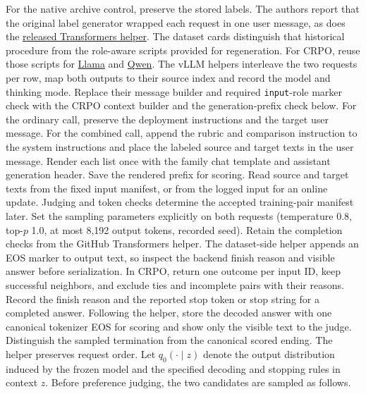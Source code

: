 \documentclass[11pt]{article}
\begin{document}
For the native archive control, preserve the stored labels. The authors report that the original label generator wrapped each request in one user message, as does the \href{https://github.com/Sizhe-Chen/SecPO/blob/da0372a0e598badf4e51c98c175a962147cac2ac/scripts/generate_response_labels.py}{released Transformers helper}. The dataset cards distinguish that historical procedure from the role-aware scripts provided for regeneration. For CRPO, reuse those scripts for \href{https://huggingface.co/datasets/Sizhe-Chen/Llama-3.1-8B-Instruct-SecPO-trainset/blob/f347c3abe1f451e88b02918c6bc3921e6816d8c6/generate_responses.py}{Llama} and \href{https://huggingface.co/datasets/Sizhe-Chen/Qwen3.6-27B-Instruct-SecPO-trainset/blob/0cbfd6e6a2c2966dbccf4fa89b6ea7fe20c8703e/generate_responses.py}{Qwen}. The vLLM helpers interleave the two requests per row, map both outputs to their source index and record the model and thinking mode. Replace their message builder and required \texttt{input}-role marker check with the CRPO context builder and the generation-prefix check below. For the ordinary call, preserve the deployment instructions and the target user message. For the combined call, append the rubric and comparison instruction to the system instructions and place the labeled source and target texts in the user message. Render each list once with the family chat template and assistant generation header. Save the rendered prefix for scoring. Read source and target texts from the fixed input manifest, or from the logged input for an online update. Judging and token checks determine the accepted training-pair manifest later. Set the sampling parameters explicitly on both requests (temperature 0.8, top-$p$ 1.0, at most 8,192 output tokens, recorded seed). Retain the completion checks from the GitHub Transformers helper. The dataset-side helper appends an EOS marker to output text, so inspect the backend finish reason and visible answer before serialization. In CRPO, return one outcome per input ID, keep successful neighbors, and exclude ties and incomplete pairs with their reasons. Record the finish reason and the reported stop token or stop string for a completed answer. Following the helper, store the decoded answer with one canonical tokenizer EOS for scoring and show only the visible text to the judge. Distinguish the sampled termination from the canonical scored ending. The helper preserves request order. Let $q_0(\cdot\mid z)$ denote the output distribution induced by the frozen model and the specified decoding and stopping rules in context $z$. Before preference judging, the two candidates are sampled as follows.
\end{document}
